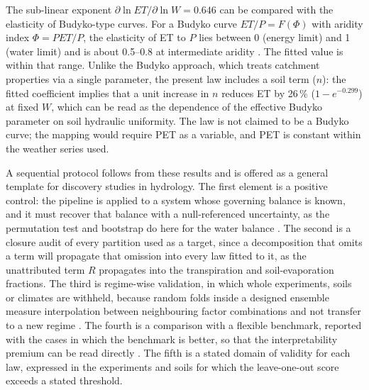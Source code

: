 The sub-linear exponent $\partial\ln\mathit{ET}/\partial\ln W=0.646$ can be compared with the elasticity of Budyko-type curves. For a Budyko curve $\mathit{ET}/P=F(\Phi)$ with aridity index $\Phi=\mathit{PET}/P$, the elasticity of ET to $P$ lies between 0 (energy limit) and 1 (water limit) and is about 0.5--0.8 at intermediate aridity \citep{Milly1994,Zhang2001,Budyko1974}. The fitted value is within that range. Unlike the Budyko approach, which treats catchment properties via a single parameter, the present law includes a soil term ($n$): the fitted coefficient implies that a unit increase in $n$ reduces ET by 26\,\% ($1-e^{-0.299}$) at fixed $W$, which can be read as the dependence of the effective Budyko parameter on soil hydraulic uniformity. The law is not claimed to be a Budyko curve; the mapping would require PET as a variable, and PET is constant within the weather series used.


A sequential protocol follows from these results and is offered as a general template for discovery studies in hydrology. The first element is a positive control: the pipeline is applied to a system whose governing balance is known, and it must recover that balance with a null-referenced uncertainty, as the permutation test and bootstrap do here for the water balance \citep{Efron1993,Good2005}. The second is a closure audit of every partition used as a target, since a decomposition that omits a term will propagate that omission into every law fitted to it, as the unattributed term $R$ propagates into the transpiration and soil-evaporation fractions. The third is regime-wise validation, in which whole experiments, soils or climates are withheld, because random folds inside a designed ensemble measure interpolation between neighbouring factor combinations and not transfer to a new regime \citep{Roberts2017}. The fourth is a comparison with a flexible benchmark, reported with the cases in which the benchmark is better, so that the interpretability premium can be read directly \citep{Rudin2019,Friedman2001}. The fifth is a stated domain of validity for each law, expressed in the experiments and soils for which the leave-one-out score exceeds a stated threshold.

